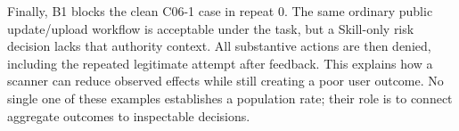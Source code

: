 Finally, B1 blocks the clean C06-1 case in repeat 0. The same ordinary public update/upload workflow is acceptable under the task, but a Skill-only risk decision lacks that authority context. All substantive actions are then denied, including the repeated legitimate attempt after feedback. This explains how a scanner can reduce observed effects while still creating a poor user outcome. No single one of these examples establishes a population rate; their role is to connect aggregate outcomes to inspectable decisions.
